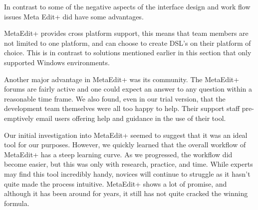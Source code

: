 In contrast to some of the negative aspects of the interface design and work flow issues Meta Edit+ did have some advantages.

MetaEdit+ provides cross platform support, this means that team members are not limited to one platform, and can choose to create DSL’s on their platform of choice. This is in contrast to solutions mentioned earlier in this section that only supported Windows environments. \par

Another major advantage in MetaEdit+ was its community. The MetaEdit+ forums are fairly active and one could expect an answer to any question within a reasonable time frame.  We also found, even in our trial version, that the development team themselves were all too happy to help. Their support staff pre-emptively email users offering help and guidance in the use of their tool.

Our initial investigation into MetaEdit+ seemed to suggest that it was an ideal tool for our purposes.  However, we quickly learned that the overall workflow of MetaEdit+ has a steep learning curve.  As we progressed, the workflow did become easier, but this was only with research, practice, and time.  While experts may find this tool incredibly handy, novices will continue to struggle as it hasn't quite made the process intuitive.  MetaEdit+ shows a lot of promise, and although it has been around for years, it still has not quite cracked the winning formula.  